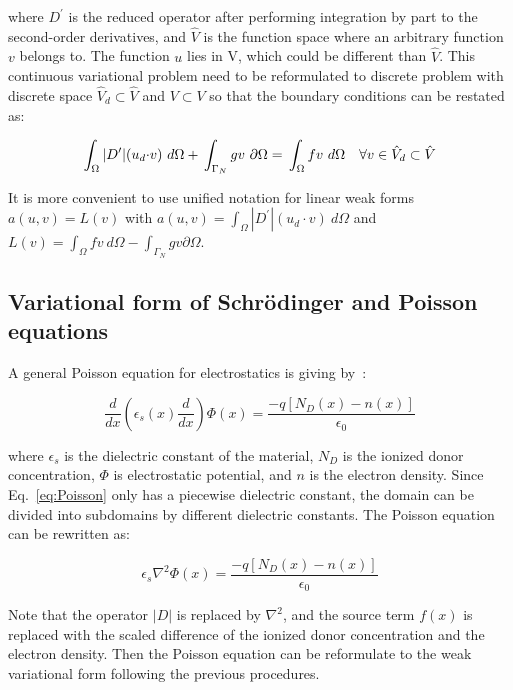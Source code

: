 where $D^\prime$ is the reduced operator after performing integration by part to the second-order derivatives, and $\hat{V}$ is the function space where an arbitrary function $v$ belongs to. The function $u$ lies in V, which could be different than $\hat{V}$. This continuous variational problem need to be reformulated to discrete problem with discrete space $\hat{V}_d \subset \hat{V}$ and $V\subset{V}$ so that the boundary conditions can be restated as:

\begin{equation}
  \int_{\Omega}|D^\prime|(u_d{\cdot}v)\ d\Omega + \\
  \int_{\Gamma_N}gv\ \partial\Omega = \\
  \int_{\Omega}fv\ d\Omega \quad \forall v \in \hat{V}_d\subset \hat{V}\\
  \label{eq:weakPDE_BC}
\end{equation}

It is more convenient to use unified notation for linear weak forms $a(u,v) =
L(v)$ with $a(u,v)=\int_{\Omega}|D^\prime|(u_d{\cdot}v)\ d\Omega$ and
$L(v)=\int_{\Omega}fv\ d\Omega- \int_{\Gamma_N}gv\partial\Omega$.

\subsection{Variational form of Schr{\"o}dinger and Poisson equations}\label{sec:VF}

A general Poisson equation for electrostatics is giving by~\cite{tan1990self}:

\begin{equation}
  \frac{d}{dx}(\epsilon_s(x)\frac{d}{dx})\Phi(x)=\frac{-q[N_D(x)-n(x)]}{\epsilon_0}
  \label{eq:Poisson}
\end{equation}

where $\epsilon_s$ is the dielectric constant of the material, $N_D$ is the
ionized donor concentration, $\Phi$ is electrostatic potential, and $n$ is the
electron density. Since Eq.~\ref{eq:Poisson} only has a piecewise dielectric
constant, the domain can be divided into subdomains by different dielectric
constants. The Poisson equation can be rewritten as:

\begin{equation}
  \epsilon_s\nabla^2\Phi(x)=\frac{-q[N_D(x)-n(x)]}{\epsilon_0}
  \label{eq:Poisson_VF}
\end{equation}

Note that the operator $|D|$ is replaced by $\nabla^2$, and the source term
$f(x)$ is replaced with the scaled difference of the ionized donor
concentration and the electron density. Then the Poisson equation can be
reformulate to the weak variational form following the previous procedures.

